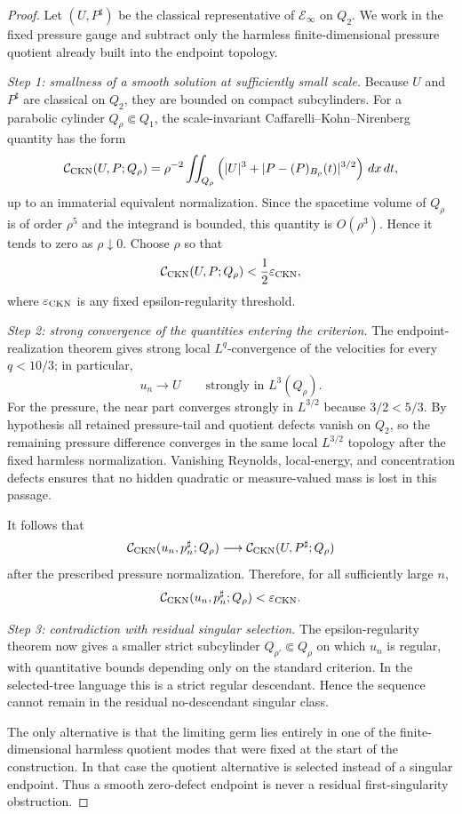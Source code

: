 \documentclass[11pt]{article}
\theoremstyle{definition}\newtheorem{problem}[theorem]{Problem}
\theoremstyle{definition}
\theoremstyle{remark}
\begin{document}
\begin{proof}
Let \((U,P^\sharp)\) be the classical representative of
\(\mathcal E_\infty\) on \(Q_2\).  We work in the fixed pressure gauge and
subtract only the harmless finite-dimensional pressure quotient already built
into the endpoint topology.

\emph{Step 1: smallness of a smooth solution at sufficiently small scale.}
Because \(U\) and \(P^\sharp\) are classical on \(Q_2\), they are bounded on
compact subcylinders.  For a parabolic cylinder \(Q_\rho\Subset Q_1\), the
scale-invariant Caffarelli--Kohn--Nirenberg quantity has the form
\[
 \mathcal C_{\rm CKN}(U,P;Q_\rho)
 =\rho^{-2}\iint_{Q_\rho}
 \left(|U|^3+|P-(P)_{B_\rho}(t)|^{3/2}\right)\,dx\,dt,
\]
up to an immaterial equivalent normalization.  Since the spacetime volume of
\(Q_\rho\) is of order \(\rho^5\) and the integrand is bounded, this quantity
is \(O(\rho^3)\).  Hence it tends to zero as \(\rho\downarrow0\).  Choose
\(\rho\) so that
\[
 \mathcal C_{\rm CKN}(U,P;Q_\rho)<\frac12\varepsilon_{\rm CKN},
\]
where \(\varepsilon_{\rm CKN}\) is any fixed epsilon-regularity threshold.

\emph{Step 2: strong convergence of the quantities entering the criterion.}
The endpoint-realization theorem gives strong local
\(L^q\)-convergence of the velocities for every \(q<10/3\); in particular,
\[
 u_n\to U\qquad\text{strongly in }L^3(Q_\rho).
\]
For the pressure, the near part converges strongly in \(L^{3/2}\) because
\(3/2<5/3\).  By hypothesis all retained pressure-tail and quotient defects
vanish on \(Q_2\), so the remaining pressure difference converges in the same
local \(L^{3/2}\) topology after the fixed harmless normalization.  Vanishing
Reynolds, local-energy, and concentration defects ensures that no hidden
quadratic or measure-valued mass is lost in this passage.

It follows that
\[
 \mathcal C_{\rm CKN}(u_n,p_n^\sharp;Q_\rho)
 \longrightarrow
 \mathcal C_{\rm CKN}(U,P^\sharp;Q_\rho)
\]
after the prescribed pressure normalization.  Therefore, for all sufficiently
large \(n\),
\[
 \mathcal C_{\rm CKN}(u_n,p_n^\sharp;Q_\rho)
 <\varepsilon_{\rm CKN}.
\]

\emph{Step 3: contradiction with residual singular selection.}
The epsilon-regularity theorem now gives a smaller strict subcylinder
\(Q_{\rho'}\Subset Q_\rho\) on which \(u_n\) is regular, with quantitative
bounds depending only on the standard criterion.  In the selected-tree
language this is a strict regular descendant.  Hence the sequence cannot
remain in the residual no-descendant singular class.

The only alternative is that the limiting germ lies entirely in one of the
finite-dimensional harmless quotient modes that were fixed at the start of
the construction.  In that case the quotient alternative is selected instead
of a singular endpoint.  Thus a smooth zero-defect endpoint is never a
residual first-singularity obstruction.
\end{proof}
\end{document}
